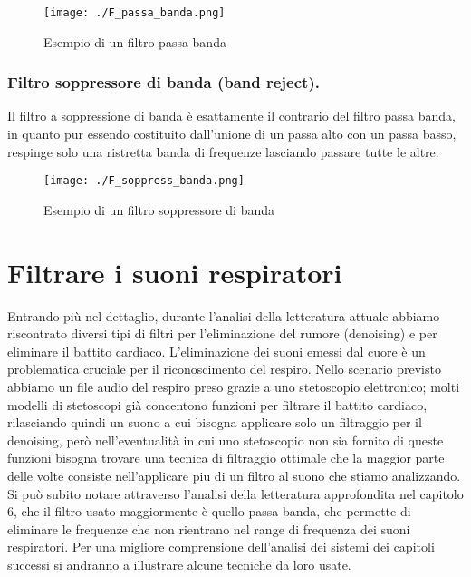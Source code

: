 \begin{figure}[h]
 \centering
 \texttt{[image: ./F\_passa\_banda.png]}
 \caption{Esempio di un filtro passa banda \cite{SELET}}
 \end{figure}


\subsubsection{Filtro soppressore di banda (band reject).}
Il filtro a soppressione di banda \`e esattamente il contrario del filtro passa banda, in quanto pur essendo costituito dall'unione di un passa alto con un passa basso, respinge solo una ristretta banda di frequenze lasciando passare tutte le altre.

\begin{figure}[h]
 \centering
 \texttt{[image: ./F\_soppress\_banda.png]}
 \caption{Esempio di un filtro soppressore di banda \cite{SELET}}
 \end{figure}

\section{Filtrare i suoni respiratori}
 
Entrando pi\`u nel dettaglio, durante l'analisi della letteratura attuale abbiamo riscontrato diversi tipi di filtri per l'eliminazione del rumore (denoising) e per eliminare il battito cardiaco.
L'eliminazione dei suoni emessi dal cuore \`e un problematica cruciale per il riconoscimento del respiro. 
Nello scenario previsto abbiamo un file audio del respiro preso grazie a uno stetoscopio elettronico; molti modelli di stetoscopi gi\`a concentono funzioni per filtrare il battito cardiaco, rilasciando quindi un suono a cui bisogna applicare solo un filtraggio per il denoising, per\`o nell'eventualit\`a in cui uno stetoscopio non sia fornito di queste funzioni bisogna trovare una tecnica di filtraggio ottimale che la maggior parte delle volte consiste nell'applicare piu di un filtro al suono che stiamo analizzando.
\newline
Si pu\`o subito notare attraverso l'analisi della letteratura approfondita nel capitolo 6, che il filtro usato maggiormente \`e quello passa banda, che permette di eliminare le frequenze che non rientrano nel range di frequenza dei suoni respiratori.
Per una migliore comprensione dell'analisi dei sistemi dei capitoli successi si andranno a illustrare alcune tecniche da loro usate.

